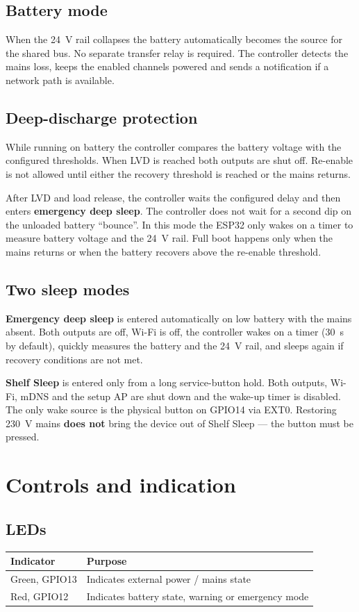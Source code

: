 \documentclass[11pt,a4paper]{article}
\begin{document}
\subsection{Battery mode}
When the 24~V rail collapses the battery automatically becomes the source for the shared bus. No separate transfer relay is required. The controller detects the mains loss, keeps the enabled channels powered and sends a notification if a network path is available.

\subsection{Deep-discharge protection}
While running on battery the controller compares the battery voltage with the configured thresholds. When LVD is reached both outputs are shut off. Re-enable is not allowed until either the recovery threshold is reached or the mains returns.

After LVD and load release, the controller waits the configured delay and then enters \textbf{emergency deep sleep}. The controller does not wait for a second dip on the unloaded battery ``bounce''. In this mode the ESP32 only wakes on a timer to measure battery voltage and the 24~V rail. Full boot happens only when the mains returns or when the battery recovers above the re-enable threshold.

\subsection{Two sleep modes}
\textbf{Emergency deep sleep} is entered automatically on low battery with the mains absent. Both outputs are off, Wi-Fi is off, the controller wakes on a timer (30~s by default), quickly measures the battery and the 24~V rail, and sleeps again if recovery conditions are not met.

\textbf{Shelf Sleep} is entered only from a long service-button hold. Both outputs, Wi-Fi, mDNS and the setup AP are shut down and the wake-up timer is disabled. The only wake source is the physical button on GPIO14 via EXT0. Restoring 230~V mains \textbf{does not} bring the device out of Shelf Sleep --- the button must be pressed.

\section{Controls and indication}

\subsection{LEDs}
\begin{tabularx}{\textwidth}{@{}lX@{}}
\toprule
\textbf{Indicator} & \textbf{Purpose} \\
\midrule
Green, GPIO13 & Indicates external power / mains state \\
Red, GPIO12 & Indicates battery state, warning or emergency mode \\
\bottomrule
\end{tabularx}
\end{document}
